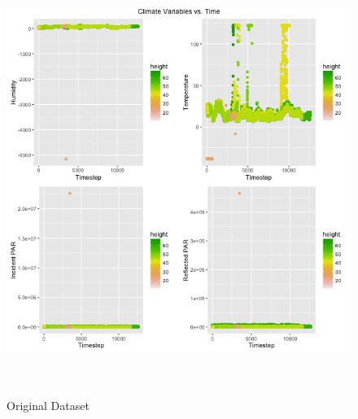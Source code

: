 \documentclass[11pt]{article}
\begin{document}
\begin{figure}
  \centering
    \includegraphics[width=\textwidth,height=14cm]{../graphs/figure2.png}
  \caption{Original Dataset}
  \label{fig:fig2}
\end{figure}
\end{document}
